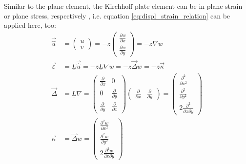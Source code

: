   Similar to the plane element, the Kirchhoff plate element can be in plane strain or plane stress, respectively \cite{steinke2005finite}, i.e. equation \eqref{eq:displ_strain_relation} can be applied here, too:
  \begin{align}
  \vec{\hat{u}} &= \begin{pmatrix}
  u\\v
  \end{pmatrix} = -z \begin{pmatrix}
  \frac{\partial w}{\partial x}\\ \frac{\partial w}{\partial y}
  \end{pmatrix} = -z \nabla w \nonumber\\
  \vec{\varepsilon} &= \underline{L} \vec{\hat{u}} = -z \underline{L} \nabla w = -z \vec{\Delta} w = -z \vec{\kappa} \label{eq:eps=-z*kappa}\\
  \vec{\Delta} &= \underline{L} \nabla = \begin{pmatrix}
  \frac{\partial}{\partial x} & 0\\
  0 & \frac{\partial}{\partial y}\\
  \frac{\partial}{\partial y} & \frac{\partial}{\partial x}
  \end{pmatrix} \begin{pmatrix}
  \frac{\partial}{\partial x} & \frac{\partial}{\partial y}
  \end{pmatrix} = \begin{pmatrix}
  \frac{\partial^2}{\partial x^2}\\
  \frac{\partial^2}{\partial y^2}\\
  2\frac{\partial^2}{\partial x\partial y}
  \end{pmatrix} \nonumber\\
  \vec{\kappa} &= \vec{\Delta}w = \begin{pmatrix}
  \frac{\partial^2w}{\partial x^2}\\
  \frac{\partial^2w}{\partial y^2}\\
  2\frac{\partial^2w}{\partial x\partial y}
  \end{pmatrix} \label{eq:kappa=Delta*w}
  \end{align}
  
